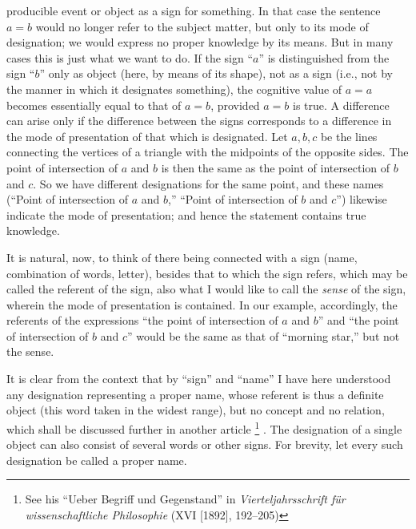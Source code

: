 \documentclass[twoside,12pt,a4paper]{article}
\newcommand{\footnoteAlph}[2][\thefootnote]{%
  \renewcommand{\thefootnote}{\Alph{footnote}}%
  \footnote[#1]{#2}%
  \renewcommand{\thefootnote}{\arabic{footnote}}}
\begin{document}
producible event or object as a sign for something. In that case the
sentence $a=b$ would no longer refer to the subject matter, but only
to its mode of designation; we would express no proper knowledge by
its means. But in many cases this is just what we want to do. If the
sign ``$a$'' is distinguished from the sign ``$b$'' only as object
(here, by means of its shape), not as a sign (i.e., not by the manner
in which it designates something), the cognitive value of $a=a$
becomes essentially equal to that of $a=b$, provided $a=b$ is true. A
difference can arise only if the difference between the signs
corresponds to a difference in the mode of presentation of that which
is designated. Let $a, b, c$ be the lines connecting the vertices of a
triangle with the midpoints of the opposite sides. The point of
intersection of $a$ and $b$ is then the same as the point of
intersection of $b$ and $c$. So we have different designations for the
same point, and these names (``Point of intersection of $a$ and $b$,''
``Point of intersection of $b$ and $c$'') likewise indicate the mode
of presentation; and hence the statement contains true knowledge.

It is natural, now, to think of there being connected with a sign
(name, combination of words, letter), besides that to which the sign
refers, which may be called the referent of the sign, also what I
would like to call the \emph{sense} of the sign, wherein the mode of
presentation is contained. In our example, accordingly, the referents
of the expressions  ``the point of intersection of $a$
and $b$'' and ``the point of intersection of $b$ and $c$'' would be
the same as that of ``morning star,'' but not the sense.

It is clear from the context that by ``sign'' and ``name'' I have here
understood any designation representing a proper name, whose referent
is thus a definite object (this word taken in the widest range), but
no concept and no relation, which shall be discussed further in
another article\footnoteAlph[2]{See his ``Ueber Begriff und
  Gegenstand'' in {\it Vierteljahrsschrift f\"ur wissenschaftliche
    Philosophie} (XVI [1892], 192--205)}. The designation of a single
object can also consist of several words or other signs. For brevity,
let every such designation be called a proper name.
\end{document}
